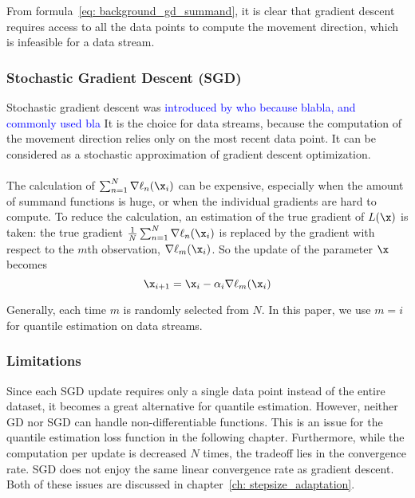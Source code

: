         From formula~\ref{eq: background_gd_summand}, it is clear that gradient descent requires access to all the data points to compute the movement direction, which is infeasible for a data stream.


    \subsubsection{Stochastic Gradient Descent (SGD)}
        Stochastic gradient descent was \textcolor{blue}{introduced by who because blabla, and commonly used bla}
        It is the choice for data streams, because the computation of the movement direction relies only on the most recent data point.
        It can be considered as a stochastic approximation of gradient descent optimization.
        \\\\
        The calculation of $\sum_{n=1}^{N} \nabla \ell_n(\x_i)$ can be
        expensive, especially when the amount of summand functions is huge, or when the individual gradients are hard to
        compute.
        To reduce the calculation, an estimation of the true gradient of $L(\x)$ is taken: 
        the true gradient $\frac{1}{N} \sum_{n=1}^{N} \nabla \ell_n(\x_i)$ is replaced by the gradient with respect to the $m$th observation, $\nabla \ell_m(\x_i)$. 
        So the update of the parameter $\x$ becomes%
        \begin{equation}
            \x_{i+1} = \x_i - \alpha_i \nabla \ell_m(\x_i)
            \label{eq: intro_SGD}
        \end{equation}
        
        Generally, each time $m$ is randomly selected from $N$. In this paper, we use $m = i$ for quantile estimation on data streams.

\subsubsection{Limitations}
Since each SGD update requires only a single data point instead of the entire dataset, it becomes a great alternative for quantile estimation.
However, neither GD nor SGD can handle non-differentiable functions. This is an issue for the quantile estimation loss function in the following chapter.
Furthermore, while the computation per update is decreased $N$ times, the tradeoff lies in the convergence rate. SGD does not enjoy the same linear convergence rate as gradient descent. Both of these issues are discussed in chapter~\ref{ch: stepsize_adaptation}.


